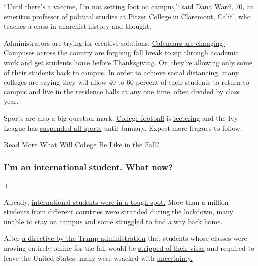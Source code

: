 ``Until there's a vaccine, I'm not setting foot on campus,'' said Dana
Ward, 70, an emeritus professor of political studies at Pitzer College
in Claremont, Calif., who teaches a class in anarchist history and
thought.

Administrators are trying for creative solutions.
\href{https://www.nytimes3xbfgragh.onion/2020/05/19/us/coronavirus-college-fall-semester.html}{Calendars
are changing:} Campuses across the country are forgoing fall break to
zip through academic work and get students home before Thanksgiving. Or,
they're allowing only
\href{https://www.nytimes3xbfgragh.onion/2020/07/06/us/coronavirus-universities-colleges-reopening.html}{some
of their students} back to campus. In order to achieve social
distancing, many colleges are saying they will allow 40 to 60 percent of
their students to return to campus and live in the residence halls at
any one time, often divided by class year.

Sports are also a big question mark.
\href{https://www.nytimes3xbfgragh.onion/2020/07/01/sports/ncaafootball/coronavirus-college-football-hbcus-clemson.html}{College
football} is
\href{https://www.nytimes3xbfgragh.onion/2020/07/10/sports/ncaafootball/coronavirus-college-football-season-canceled.html}{teetering}
and the Ivy League has
\href{https://www.nytimes3xbfgragh.onion/2020/07/08/sports/ncaafootball/ivy-league-fall-sports-football-coronavirus.html}{suspended
all sports} until January. Expect more leagues to follow.

Read More
\href{https://www.nytimes3xbfgragh.onion/2020/06/03/magazine/covid-college-fall.html}{What
Will College Be Like in the Fall?}

\hypertarget{im-an-international-student-what-now}{%
\subsubsection{I'm an international student. What
now?}\label{im-an-international-student-what-now}}

+

Already,
\href{https://www.nytimes3xbfgragh.onion/2020/04/25/us/coronavirus-international-foreign-students-universities.html}{international
students were in a tough spot.} More than a million students from
different countries were stranded during the lockdown, many unable to
stay on campus and some struggled to find a way back home.

After
\href{https://www.nytimes3xbfgragh.onion/aponline/2020/07/06/us/politics/ap-us-virus-outbreak-international-students.html}{a
directive by the Trump administration} that students whose classes were
moving entirely online for the fall would be
\href{https://www.nytimes3xbfgragh.onion/2020/07/07/us/student-visas-coronavirus.html}{stripped
of their visas} and required to leave the United States, many were
wracked with
\href{https://www.nytimes3xbfgragh.onion/2020/07/09/world/international-students-visa-reaction.html}{uncertainty.}

